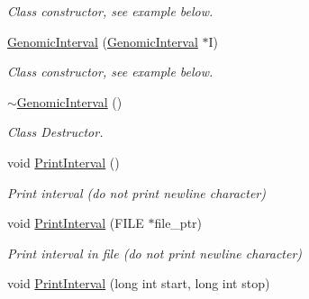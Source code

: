 \begin{DoxyCompactItemize}
\begin{DoxyCompactList}\small\item\em Class constructor, see example below. \end{DoxyCompactList}\item 
\hypertarget{classGenomicInterval_a4132f8d27fa5ebe416abe41150974c14}{
\hyperlink{classGenomicInterval_a4132f8d27fa5ebe416abe41150974c14}{GenomicInterval} (\hyperlink{classGenomicInterval}{GenomicInterval} $\ast$I)}
\label{classGenomicInterval_a4132f8d27fa5ebe416abe41150974c14}

\begin{DoxyCompactList}\small\item\em Class constructor, see example below. \end{DoxyCompactList}\item 
\hypertarget{classGenomicInterval_a632a255d16cb13b15b2f2d4f826cace7}{
\hyperlink{classGenomicInterval_a632a255d16cb13b15b2f2d4f826cace7}{$\sim$GenomicInterval} ()}
\label{classGenomicInterval_a632a255d16cb13b15b2f2d4f826cace7}

\begin{DoxyCompactList}\small\item\em Class Destructor. \end{DoxyCompactList}\item 
\hypertarget{classGenomicInterval_afeba30dc21d2e5ed7e460eb1b79f021b}{
void \hyperlink{classGenomicInterval_afeba30dc21d2e5ed7e460eb1b79f021b}{PrintInterval} ()}
\label{classGenomicInterval_afeba30dc21d2e5ed7e460eb1b79f021b}

\begin{DoxyCompactList}\small\item\em Print interval (do not print newline character) \end{DoxyCompactList}\item 
\hypertarget{classGenomicInterval_a968607fbfe88e86760924156f6519d98}{
void \hyperlink{classGenomicInterval_a968607fbfe88e86760924156f6519d98}{PrintInterval} (FILE $\ast$file\_\-ptr)}
\label{classGenomicInterval_a968607fbfe88e86760924156f6519d98}

\begin{DoxyCompactList}\small\item\em Print interval in file (do not print newline character) \end{DoxyCompactList}\item 
\hypertarget{classGenomicInterval_a310800040ea4e328f5899611143caee0}{
void \hyperlink{classGenomicInterval_a310800040ea4e328f5899611143caee0}{PrintInterval} (long int start, long int stop)}
\label{classGenomicInterval_a310800040ea4e328f5899611143caee0}


\end{DoxyCompactItemize}
